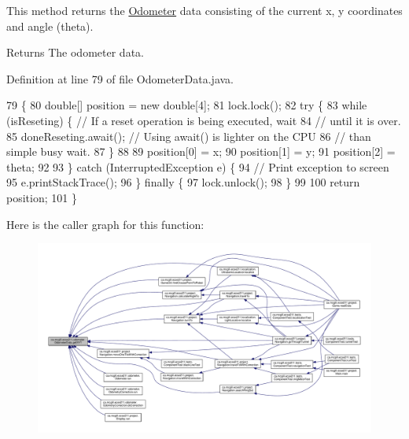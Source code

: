 This method returns the \hyperlink{classca_1_1mcgill_1_1ecse211_1_1odometer_1_1_odometer}{Odometer} data consisting of the current x, y coordinates and angle (theta).

\begin{DoxyReturn}{Returns}
The odometer data. 
\end{DoxyReturn}


Definition at line 79 of file Odometer\+Data.\+java.


\begin{DoxyCode}
79                            \{
80     \textcolor{keywordtype}{double}[] position = \textcolor{keyword}{new} \textcolor{keywordtype}{double}[4];
81     lock.lock();
82     \textcolor{keywordflow}{try} \{
83       \textcolor{keywordflow}{while} (isReseting) \{ \textcolor{comment}{// If a reset operation is being executed, wait}
84         \textcolor{comment}{// until it is over.}
85         doneReseting.await(); \textcolor{comment}{// Using await() is lighter on the CPU}
86         \textcolor{comment}{// than simple busy wait.}
87       \}
88 
89       position[0] = x;
90       position[1] = y;
91       position[2] = theta;
92 
93     \} \textcolor{keywordflow}{catch} (InterruptedException e) \{
94       \textcolor{comment}{// Print exception to screen}
95       e.printStackTrace();
96     \} \textcolor{keywordflow}{finally} \{
97       lock.unlock();
98     \}
99 
100     \textcolor{keywordflow}{return} position;
101   \}
\end{DoxyCode}
Here is the caller graph for this function\+:
\nopagebreak
\begin{figure}[H]
\begin{center}
\leavevmode
\includegraphics[width=350pt]{classca_1_1mcgill_1_1ecse211_1_1odometer_1_1_odometer_data_a8f40f0264c68f0cbed4fff1723ae7863_icgraph}
\end{center}
\end{figure}
\mbox{\label{classca_1_1mcgill_1_1ecse211_1_1odometer_1_1_odometer_data_a419b8f07c2c5374411c8e62298e9a402}} 
